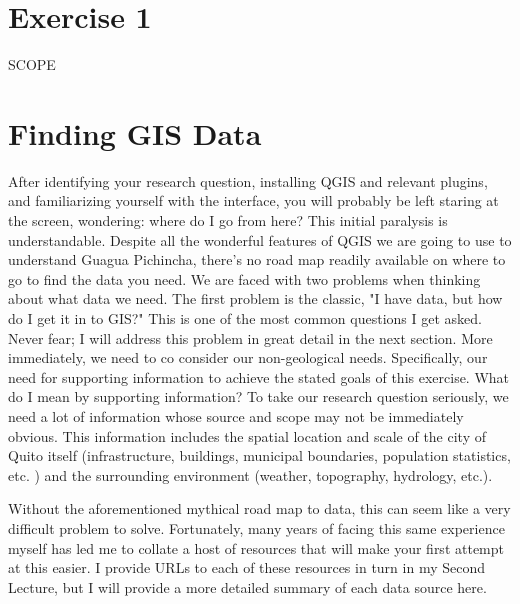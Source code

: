 \documentclass{article}
\begin{document}
\section{Exercise 1}

SCOPE

\section{Finding GIS Data}

After identifying your research question, installing QGIS and relevant plugins, and familiarizing yourself with the interface, you will probably be left staring at the screen, wondering: where do I go from here? This initial paralysis is understandable. Despite all the wonderful features of QGIS we are going to use to understand Guagua Pichincha, there's no road map readily available on where to go to find the data you need. We are faced with two problems when thinking about what data we need. The first problem is the classic, "I have data, but how do I get it in to GIS?" This is one of the most common questions I get asked. Never fear; I will address this problem in great detail in the next section. More immediately, we need to co consider our non-geological needs. Specifically, our need for supporting information to achieve the stated goals of this exercise. What do I mean by supporting information? To take our research question seriously, we need a lot of information whose source and scope may not be immediately obvious. This information includes the spatial location and scale of the city of Quito itself (infrastructure, buildings, municipal boundaries, population statistics, etc. ) and the surrounding environment (weather, topography, hydrology, etc.). 

Without the aforementioned mythical road map to data, this can seem like a very difficult problem to solve. Fortunately, many years of facing this same experience myself has led me to collate a host of resources that will make your first attempt at this easier. I provide URLs to each of these resources in turn in my Second Lecture, but I will provide a more detailed summary of each data source here. 
\end{document}
